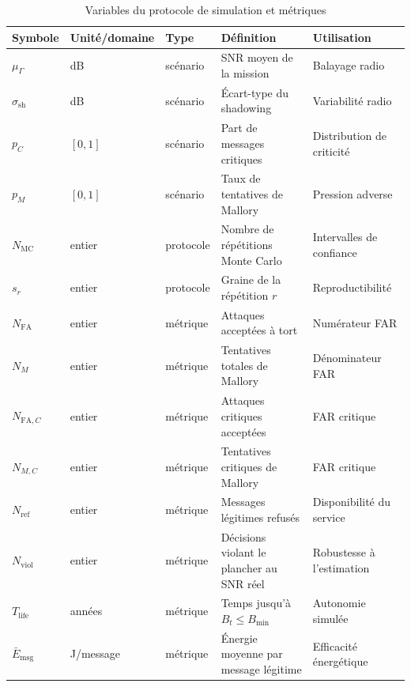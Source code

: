 \documentclass[conference,a4paper]{IEEEtran}
\begin{document}
\begin{table}[H]
\caption{Variables du protocole de simulation et métriques}
\label{tab:variables-sim}
\centering\footnotesize
\begin{tabularx}{\textwidth}{@{}l l l Y Y@{}}
\toprule
Symbole & Unité/domaine & Type & Définition & Utilisation \\
\midrule
$\mu_{\Gamma}$ & dB & scénario & SNR moyen de la mission & Balayage radio \\
$\sigma_{\mathrm{sh}}$ & dB & scénario & Écart-type du shadowing & Variabilité radio \\
$p_C$ & $[0,1]$ & scénario & Part de messages critiques & Distribution de criticité \\
$p_M$ & $[0,1]$ & scénario & Taux de tentatives de Mallory & Pression adverse \\
$N_{\mathrm{MC}}$ & entier & protocole & Nombre de répétitions Monte Carlo & Intervalles de confiance \\
$s_r$ & entier & protocole & Graine de la répétition $r$ & Reproductibilité \\
$N_{\mathrm{FA}}$ & entier & métrique & Attaques acceptées à tort & Numérateur FAR \\
$N_{M}$ & entier & métrique & Tentatives totales de Mallory & Dénominateur FAR \\
$N_{\mathrm{FA},C}$ & entier & métrique & Attaques critiques acceptées & FAR critique \\
$N_{M,C}$ & entier & métrique & Tentatives critiques de Mallory & FAR critique \\
$N_{\mathrm{ref}}$ & entier & métrique & Messages légitimes refusés & Disponibilité du service \\
$N_{\mathrm{viol}}$ & entier & métrique & Décisions violant le plancher au SNR réel & Robustesse à l'estimation \\
$T_{\mathrm{life}}$ & années & métrique & Temps jusqu'à $B_t\le B_{\min}$ & Autonomie simulée \\
$\bar E_{\mathrm{msg}}$ & J/message & métrique & Énergie moyenne par message légitime & Efficacité énergétique \\
\bottomrule
\end{tabularx}
\end{table}
\end{document}

